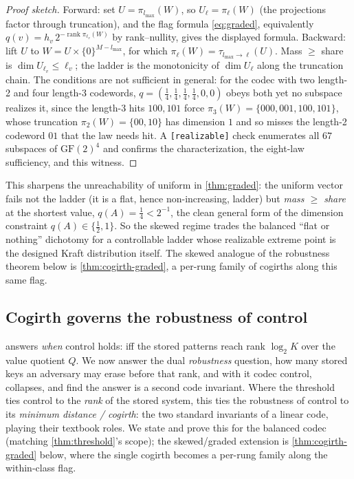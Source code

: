 \documentclass[sigconf,nonacm,anonymous,balance=false]{acmart}
\newcommand{\GF}{\mathrm{GF}(2)}
\DeclareMathOperator{\rank}{rank}
\newcommand{\W}{W}                          %
\newcommand{\proj}{\pi}                     %
\newcommand{\Quot}{Q}                       %
\begin{document}
\begin{proof}[Proof sketch]
Forward: set $U = \proj_{l_{\max}}(\W)$, so $U_\ell = \proj_\ell(\W)$ (the projections factor
through truncation), and the flag formula \eqref{eq:graded}, equivalently $q(v) = h_v\,
2^{-\rank \proj_{\ell_v}(\W)}$ by rank--nullity, gives the displayed formula.
Backward: lift $U$ to $\W = U \times \{0\}^{M - l_{\max}}$, for which $\proj_\ell(\W) =
\tau_{l_{\max} \to \ell}(U)$. Mass $\ge$ share is $\dim U_{\ell_v} \le \ell_v$; the ladder is
the monotonicity of $\dim U_\ell$ along the truncation chain. The conditions are not sufficient
in general: for the codec with two length-2 and four length-3 codewords,
$q = (\tfrac14,\tfrac14,\tfrac14,\tfrac14,0,0)$ obeys both yet no subspace realizes it, since the
length-3 hits $100, 101$ force $\proj_3(\W) = \{000,001,100,101\}$, whose truncation
$\proj_2(\W) = \{00,10\}$ has dimension $1$ and so misses the length-2 codeword $01$ that the law
needs hit. A \texttt{[realizable]} check enumerates all $67$ subspaces of $\GF^4$ and confirms the
characterization, the eight-law sufficiency, and this witness.
\end{proof}

This sharpens the unreachability of uniform in \cref{thm:graded}: the uniform vector fails not the
ladder (it is a flat, hence non-increasing, ladder) but \emph{mass $\ge$ share} at the shortest
value, $q(A) = \tfrac14 < 2^{-1}$, the clean general form of the dimension constraint $q(A) \in
\{\tfrac12, 1\}$. So the skewed regime trades the balanced ``flat or nothing'' dichotomy for a
controllable ladder whose realizable extreme point is the designed Kraft distribution itself. The
skewed analogue of the robustness theorem below is \cref{thm:cogirth-graded}, a per-rung family of
cogirths along this same flag.

\subsection{Cogirth governs the robustness of control}
\label{sec:t5b}

 answers \emph{when} control holds: iff the stored patterns reach rank
$\log_2 K$ over the value quotient $\Quot$. We now answer the dual \emph{robustness}
question, how many stored keys an adversary may erase before that rank, and with it codec
control, collapses, and find the answer is a second code invariant. Where the threshold
ties control to the \emph{rank} of the stored system, this ties the robustness of control
to its \emph{minimum distance / cogirth}: the two standard invariants of a linear code,
playing their textbook roles. We state and prove this for the balanced codec (matching
\cref{thm:threshold}'s scope); the skewed/graded extension is \cref{thm:cogirth-graded}
below, where the single cogirth becomes a per-rung family along the within-class flag.
\end{document}
